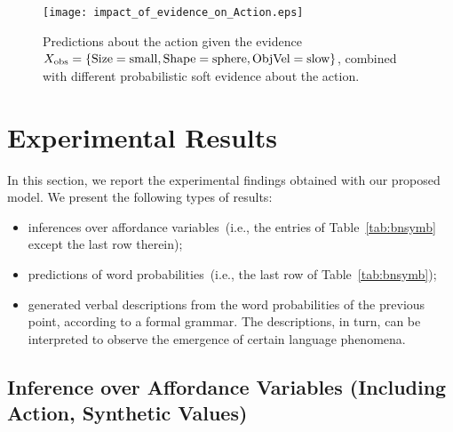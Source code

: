 
\begin{figure}
\centering
\texttt{[image: impact\_of\_evidence\_on\_Action.eps]}
\caption{Predictions about the action given the evidence $X_\text{obs} =\{\text{Size}=\text{small}, \text{Shape}=\text{sphere}, \text{ObjVel}=\text{slow}\}$, combined with different probabilistic soft evidence about the action.}
\label{fig:impact_of_evidence_on_Action}
\end{figure}

\section{Experimental Results}
\label{sec:results}

In this section, we report the experimental findings obtained with our proposed model.
We present the following types of results:
\begin{itemize}
  \item inferences over affordance variables~(i.e., the entries of Table~\ref{tab:bnsymb} except the last row therein);

  \item predictions of word probabilities~(i.e., the last row of Table~\ref{tab:bnsymb});

  \item generated verbal descriptions from the word probabilities of the previous point, according to a formal grammar. The descriptions, in turn, can be interpreted to observe the emergence of certain language phenomena.%
\end{itemize}

\subsection{Inference over Affordance Variables (Including Action, Synthetic Values)}

